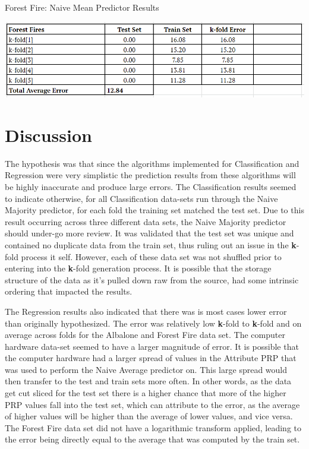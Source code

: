 \documentclass[twoside,11pt]{article}
\begin{document}
\begin{table}[h!]
	\begin{center}
		\caption{Forest Fire: Naive Mean Predictor Results}
		\label{tab:table6}
		\includegraphics[scale=.6]{FF_Results}\newline
	\end{center}
\end{table}



\newpage

\section{Discussion}
The hypothesis was that since the algorithms implemented for Classification and Regression were very simplistic the prediction results from these algorithms will be highly inaccurate and produce large errors.\newline
The Classification results seemed to indicate otherwise, for all Classification data-sets run through the Naive Majority predictor, for each fold the training set matched the test set. Due to this result occurring across three different data sets, the Naive Majority predictor should under-go more review. It was validated that the test set was unique and contained no duplicate data from the train set, thus ruling out an issue in the \textbf{k}-fold process it self. However, each of these data set was not shuffled prior to entering into the \textbf{k}-fold generation process. It is possible that the storage structure of the data as it's pulled down raw from the source, had some intrinsic ordering that impacted the results.\newline

The Regression results also indicated that there was is most cases lower error than originally hypothesized. The error was relatively low \textbf{k}-fold to \textbf{k}-fold and on average across folds for the Albalone and Forest Fire data set. The computer hardware data-set seemed to have a larger magnitude of error. It is possible that the computer hardware had a larger spread of values in the Attribute PRP that was used to perform the Naive Average predictor on. This large spread would then transfer to the test and train sets more often. In other words, as the data get cut sliced for the test set there is a higher chance that more of the higher PRP values fall into the test set, which can attribute to the error, as the average of higher values will be higher than the average of lower values, and vice versa. The Forest Fire data set did not have a logarithmic transform applied, leading to the error being directly equal to the average that was computed by the train set. 
\end{document}

